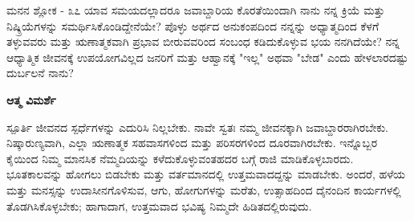 

\newpage
\begin{mananam}{\mananamfont \large ಮನನ ಶ್ಲೋಕ - ೩೭}
{\footnotesize \mananamtext ಯಾವ ಸಮಯದಲ್ಲಾದರೂ ಜವಾಬ್ದಾರಿಯ ಕೊರತೆಯಿಂದಾಗಿ ನಾನು ನನ್ನ ಕ್ರಿಯೆ ಮತ್ತು ನಿಷ್ಕ್ರಿಯೆಗಳನ್ನು ಸಮರ್ಥಿಸಿಕೊಂಡಿದ್ದೇನೆಯೇ? ಪೊಳ್ಳು ಅರ್ಥದ ಅನುಕಂಪದಿಂದ ನನ್ನನ್ನು ಅಧ್ಯಾತ್ಮದಿಂದ ಕೆಳಗೆ ತಳ್ಳುವವರು ಮತ್ತು ಋಣಾತ್ಮಕವಾಗಿ ಪ್ರಭಾವ ಬೀರುವವರಿಂದ ಸಂಬಂಧ ಕಡಿದುಕೊಳ್ಳುವ ಭಯ ನನಗಿದೆಯೇ? ನನ್ನ ಆಧ್ಯಾತ್ಮಿಕ ಜೀವನಕ್ಕೆ ಉಪಯೋಗವಿಲ್ಲದ ಜನರಿಗೆ ಮತ್ತು ಆಹ್ವಾನಕ್ಕೆ "ಇಲ್ಲ" ಅಥವಾ "ಬೇಡ" ಎಂದು ಹೇಳಲಾರದಷ್ಟು ದುರ್ಬಲನೆ ನಾನು?}
\end{mananam}
\WritingHand\enspace\textbf{ಆತ್ಮ ವಿಮರ್ಶೆ}
\begin{inspiration}{\mananamfont \large ಸ್ಪೂರ್ತಿ}
{\footnotesize \mananamtext ಜೀವನದ ಸ್ಪರ್ಧೆಗಳನ್ನು ಎದುರಿಸಿ ನಿಲ್ಲಬೇಕು. ನಾವೇ ಸ್ವತಃ ನಮ್ಮ ಜೀವನಕ್ಕಾಗಿ ಜವಾಬ್ದಾರರಾಗಿರಬೇಕು.  ನಿಷ್ಕಾರುಣ್ಯವಾಗಿ, ಎಲ್ಲಾ ಋಣಾತ್ಮಕ ಸಹವಾಸಗಳಿಂದ ಮತ್ತು ಪರಿಸರಗಳಿಂದ ದೂರವಾಗಿರಬೇಕು. ಇನ್ನೊಬ್ಬರ ಕೈಯಿಂದ ನಿಮ್ಮ ಮಾನಸಿಕ ನೆಮ್ಮದಿಯನ್ನು ಕಳೆದುಕೊಳ್ಳುವಂತಹದರ ಬಗ್ಗೆ ರಾಜಿ ಮಾಡಿಕೊಳ್ಳಬಾರದು. ಭೂತಕಾಲವನ್ನು ಹೋಗಲು ಬಿಡಬೇಕು ಮತ್ತು ವರ್ತಮಾನದಲ್ಲಿ ಉತ್ತಮವಾದದ್ದನ್ನು ಮಾಡಬೇಕು. ಅಂದರೆ, ಹಳೆಯ ಮತ್ತು ಮನಸ್ಸನ್ನು ಉದಾಸೀನಗೊಳಿಸುವ, ಆಗು, ಹೋಗುಗಳನ್ನು ಮರೆತು, ಉತ್ಸಾಹದಿಂದ ದೈನಂದಿನ ಕಾರ್ಯಗಳಲ್ಲಿ ತೊಡಗಿಸಿಕೊಳ್ಳಬೇಕು; ಹಾಗಾದಾಗ,  ಉತ್ತಮವಾದ ಭವಿಷ್ಯ ನಿಮ್ಮದೇ ಹಿಡಿತದಲ್ಲಿರುವುದು.}
\end{inspiration}
\newpage


